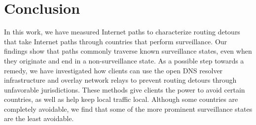 \section{Conclusion}
\label{conclusion}

In this work, we have measured Internet paths to characterize routing
detours that take Internet paths through countries that perform
surveillance.  Our findings show that paths commonly traverse known
surveillance states, even when they originate and end in a
non-surveillance state.  As a possible step towards a remedy, we have
investigated how clients can use the open DNS resolver infrastructure
and overlay network relays to prevent routing detours through
unfavorable jurisdictions.  These methods give clients the power to
avoid certain countries, as well as help keep local traffic local.
Although some countries are completely avoidable, we find that some of
the more prominent surveillance states are the least avoidable.
